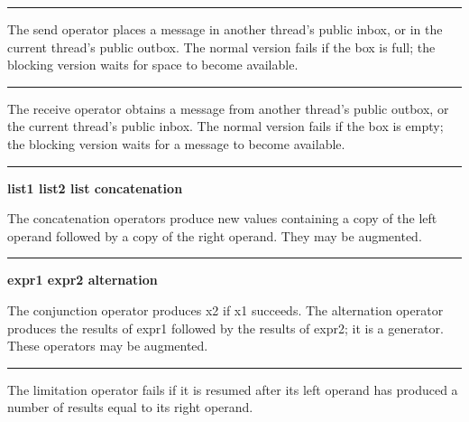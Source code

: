 \bigskip\hrule\vspace{0.1cm}
 \linebreak
{}

\noindent The send operator places a message in another thread's public
inbox, or in the current thread's public outbox. The normal version fails
if the box is full; the blocking version waits for space to become
available.

\bigskip\hrule\vspace{0.1cm}
 \linebreak
{}

\noindent The receive operator obtains a message from another thread's public
outbox, or the current thread's public inbox. The normal version fails
if the box is empty; the blocking version waits for a message to become
available.

\bigskip\hrule\vspace{0.1cm}

\noindent
{\bf list1 {\textbar}{\textbar}{\textbar} list2 \hfill list concatenation}

\noindent The concatenation operators produce new values
containing a copy of the left operand followed by a copy of the right
operand. They may be augmented.

\bigskip\hrule\vspace{0.1cm}

\noindent
{\bf expr1 {\textbar} expr2 \hfill alternation}

\noindent
The conjunction operator produces \textsf{x2} if
\textsf{x1} succeeds. The alternation operator produces the results of \textsf{expr1} followed
by the results of \textsf{expr2}; it is a generator.
These operators may be augmented.

\bigskip\hrule\vspace{0.1cm}

\noindent
The limitation operator fails if it
is resumed after its left operand has produced a number of results
equal to its right operand.

